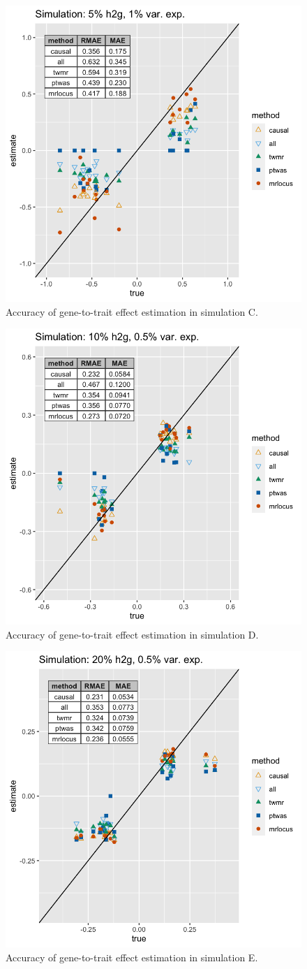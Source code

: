 \documentclass[11pt]{article}
\begin{document}
\begin{figure}[!ht]
  \centering
  \includegraphics[width=.6\textwidth]{figs/sim2.png}
  \caption{Accuracy of gene-to-trait effect estimation in simulation C.}
\end{figure}

\begin{figure}[!ht]
  \centering
  \includegraphics[width=.6\textwidth]{figs/sim4.png}
  \caption{Accuracy of gene-to-trait effect estimation in simulation D.}
\end{figure}

\begin{figure}[!ht]
  \centering
  \includegraphics[width=.6\textwidth]{figs/sim6.png}
  \caption{Accuracy of gene-to-trait effect estimation in simulation E.}
\end{figure}
\end{document}
